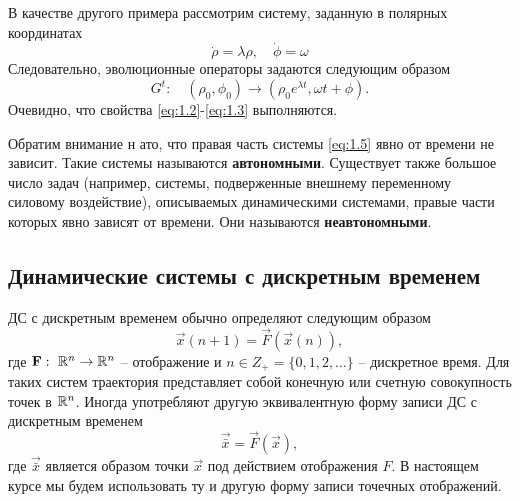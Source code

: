 В качестве другого примера рассмотрим систему, заданную в полярных координатах
\begin{equation}
	\dot \rho = \lambda \rho, \quad \dot \phi = \omega
\end{equation}
Следовательно, эволюционные операторы задаются следующим образом
\begin{equation}
	G^t:\quad (\rho_0,\phi_0) \rightarrow (\rho_0 e^{\lambda t}, \omega t + \phi).
\end{equation}
Очевидно, что свойства \eqref{eq:1.2}-\eqref{eq:1.3} выполняются.

Обратим внимание н ато, что правая часть системы \eqref{eq:1.5} явно от времени не зависит. Такие системы называются \textbf{автономными}. Существует также большое число задач (например, системы, подверженные внешнему переменному силовому воздействие), описываемых динамическими системами, правые части которых явно зависят от времени. Они называются \textbf{неавтономными}.


\subsection{Динамические системы с дискретным временем} %
ДС с дискретным временем обычно определяют следующим образом
\begin{equation}
	\label{eq:1.6}
	\vec x(n+1)= \vec F (\vec x(n)),
\end{equation}
где $\mathbf F: ~ \mathbb{R}^n \rightarrow \mathbb{R}^n$ -- отображение и $n \in Z_+ = \{0,1,2, \dots\}$ -- дискретное время. Для таких систем траектория представляет собой конечную или счетную совокупность точек в $\mathbb{R}^n$. Иногда употребляют другую эквивалентную форму записи ДС с дискретным временем
\begin{equation}
	\vec {\bar {x}} = \vec F (\vec x),
\end{equation}
где $\vec{\bar x}$ является образом точки $\vec x$ под действием отображения $F$. В настоящем курсе мы будем использовать ту и другую форму записи точечных отображений.


